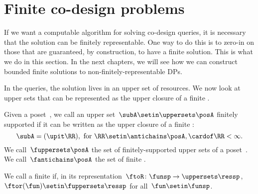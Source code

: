 \section{Finite co-design problems}

If we want a computable algorithm for solving co-design queries, it is necessary that the solution can be finitely representable.
One way to do this is to zero-in on those  that are guaranteed, by construction, to have a finite solution.
This is what we do in this section.
In the next chapters, we will see how we can construct bounded finite solutions to non-finitely-representable DPs.

In the \FixFunMinRes queries, the solution lives in an upper set of resources.
We now look at upper sets that can be represented as the upper closure of a finite .

\begin{definition}
    \label{def:fuppersets}
    Given a poset~\posA, we call an upper set~$\subA \setin \uppersets \posA$ finitely supported
    if it can be written as the upper closure of a finite :
    \begin{equation}
        \subA = (\upit\RR), \text{ for } \RR \setin \antichains \posA, \cardof\RR < \infty.
    \end{equation}
    We call~$\fuppersets \posA$ the set of finitely-supported upper sets of a poset~\posA.\\
    We call~$\fantichains \posA$ the set of finite .
\end{definition}

\begin{definition}
    \label{def:finite_des_prob}
    We call a  finite if, in its representation~$\ftoR \colon \funsp \to \uppersets \ressp$,
    ~$\ftor(\fun) \setin \fuppersets\ressp$ for all~$\fun\setin\funsp$.
\end{definition}

